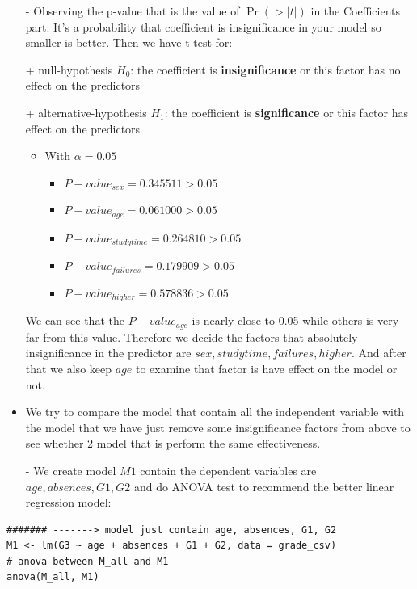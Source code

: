 \documentclass[a4paper]{article}
\numberwithin{equation}{section}
\begin{document}
\begin{itemize}
  \item[-] Observing the p-value that is the value of \(\Pr(>|t|)\) in the Coefficients part. It's a probability that coefficient is insignificance in your model so smaller is better. Then we have t-test for:
\end{itemize}
\begin{itemize}
  \item[+] null-hypothesis \(H_{0}\): the coefficient is \textbf{insignificance} or this factor has no effect on the predictors
  \item[+] alternative-hypothesis \(H_{1}\): the coefficient is \textbf{significance} or this factor has effect on the predictors
        \begin{itemize}
          \item With \(\alpha = 0.05\)
                \begin{itemize}
                  \item \(P-value_{sex} = 0.345511 > 0.05\)
                  \item \(P-value_{age} = 0.061000 > 0.05\)
                  \item \(P-value_{studytime} = 0.264810 > 0.05\)
                  \item \(P-value_{failures} = 0.179909 > 0.05\)
                  \item \(P-value_{higher} = 0.578836 > 0.05\)
                \end{itemize}
        \end{itemize}

        We can see that the \(P-value_{age}\) is nearly close to 0.05 while others is very far from this value. Therefore we decide the factors that absolutely insignificance in the predictor are \(sex, studytime, failures, higher\). And after that we also keep \(age\) to examine that factor is have effect on the model or not.
\end{itemize}

\begin{itemize}
  \item We try to compare the model that contain all the independent variable with the model that we have just remove some insignificance factors from above to see whether 2 model that is perform the same effectiveness.
\end{itemize}
\begin{itemize}
  \item[-] We create model \(M1\) contain the dependent variables are \(age, absences, G1, G2\) and do ANOVA test to recommend the better linear regression model:
\end{itemize}
\begin{mdframed}[leftline=false,rightline=false,backgroundcolor=magenta!10,nobreak=true]
  \begin{verbatim}
####### -------> model just contain age, absences, G1, G2
M1 <- lm(G3 ~ age + absences + G1 + G2, data = grade_csv)
# anova between M_all and M1
anova(M_all, M1)
  \end{verbatim}
\end{mdframed}
\end{document}
